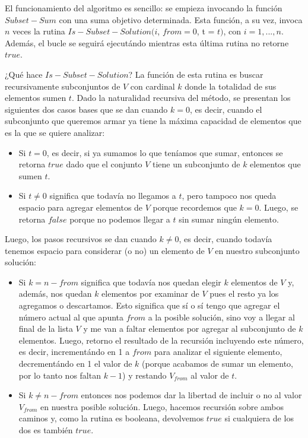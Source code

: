 El funcionamiento del algoritmo es sencillo: se empieza invocando la función $Subset-Sum$ con una suma objetivo determinada. Esta función, a su vez, invoca $n$ veces la rutina $Is-Subset-Solution(i$, $from = 0$, t = $t)$, con $i = 1, ..., n$. Además, el bucle se seguirá ejecutándo mientras esta última rutina no retorne $true$.

\vskip 8pt

¿Qué hace $Is-Subset-Solution$? La función de esta rutina es buscar recursivamente subconjuntos de $V$ con cardinal $k$ donde la totalidad de sus elementos sumen $t$. Dado la naturalidad recursiva del método, se presentan los siguientes dos casos bases que se dan cuando $k = 0$, es decir, cuando el subconjunto que queremos armar ya tiene la máxima capacidad de elementos que es la que se quiere analizar:
\begin{itemize}
	\item Si $t = 0$, es decir, si ya sumamos lo que teníamos que sumar, entonces se retorna $true$ dado que el conjunto $V$ tiene un subconjunto de $k$ elementos que sumen $t$.
	\item Si $t \neq 0$ significa que todavía no llegamos a $t$, pero tampoco nos queda espacio para agregar elementos de $V$ porque recordemos que $k = 0$. Luego, se retorna $false$ porque no podemos llegar a $t$ sin sumar ningún elemento.
\end{itemize}
Luego, los pasos recursivos se dan cuando $k \neq 0$, es decir, cuando todavía tenemos espacio para considerar (o no) un elemento de $V$ en nuestro subconjunto solución:
\begin{itemize}
	\item Si $k = n - from$ significa que todavía nos quedan elegir $k$ elementos de $V$ y, además, nos quedan $k$ elementos por examinar de $V$ pues el resto ya los agregamos o descartamos. Esto significa que sí o sí tengo que agregar el número actual al que apunta $from$ a la posible solución, sino voy a llegar al final de la lista $V$ y me van a faltar elementos por agregar al subconjunto de $k$ elementos. Luego, retorno el resultado de la recursión incluyendo este número, es decir, incrementándo en 1 a $from$ para analizar el siguiente elemento, decrementándo en 1 el valor de $k$ (porque acabamos de sumar un elemento, por lo tanto nos faltan $k - 1$) y restando $V_{from}$ al valor de $t$.
	\item  Si $k \neq n - from$ entonces nos podemos dar la libertad de incluir o no al valor $V_{from}$ en nuestra posible solución. Luego, hacemos recursión sobre ambos caminos y, como la rutina es booleana, devolvemos $true$ si cualquiera de los dos es también $true$.
\end{itemize}

